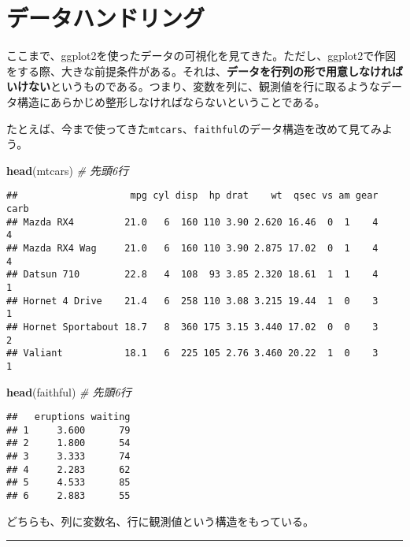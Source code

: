 \documentclass[]{book}
\newenvironment{Shaded}{\begin{snugshade}}{\end{snugshade}}
\newcommand{\KeywordTok}[1]{\textcolor[rgb]{0.13,0.29,0.53}{\textbf{#1}}}
\newcommand{\CommentTok}[1]{\textcolor[rgb]{0.56,0.35,0.01}{\textit{#1}}}
\newcommand{\NormalTok}[1]{#1}
\begin{document}
\chapter{データハンドリング}\label{data-handling}

ここまで、ggplot2を使ったデータの可視化を見てきた。ただし、ggplot2で作図をする際、大きな前提条件がある。それは、\textbf{データを行列の形で用意しなければいけない}というものである。つまり、変数を列に、観測値を行に取るようなデータ構造にあらかじめ整形しなければならないということである。

たとえば、今まで使ってきた\texttt{mtcars}、\texttt{faithful}のデータ構造を改めて見てみよう。

\begin{Shaded}
\begin{Highlighting}[]
\KeywordTok{head}\NormalTok{(mtcars) }\CommentTok{# 先頭6行}
\end{Highlighting}
\end{Shaded}

\begin{verbatim}
##                    mpg cyl disp  hp drat    wt  qsec vs am gear carb
## Mazda RX4         21.0   6  160 110 3.90 2.620 16.46  0  1    4    4
## Mazda RX4 Wag     21.0   6  160 110 3.90 2.875 17.02  0  1    4    4
## Datsun 710        22.8   4  108  93 3.85 2.320 18.61  1  1    4    1
## Hornet 4 Drive    21.4   6  258 110 3.08 3.215 19.44  1  0    3    1
## Hornet Sportabout 18.7   8  360 175 3.15 3.440 17.02  0  0    3    2
## Valiant           18.1   6  225 105 2.76 3.460 20.22  1  0    3    1
\end{verbatim}

\begin{Shaded}
\begin{Highlighting}[]
\KeywordTok{head}\NormalTok{(faithful) }\CommentTok{# 先頭6行}
\end{Highlighting}
\end{Shaded}

\begin{verbatim}
##   eruptions waiting
## 1     3.600      79
## 2     1.800      54
## 3     3.333      74
## 4     2.283      62
## 5     4.533      85
## 6     2.883      55
\end{verbatim}

どちらも、列に変数名、行に観測値という構造をもっている。

\begin{center}\rule{0.5\linewidth}{\linethickness}\end{center}
\end{document}
